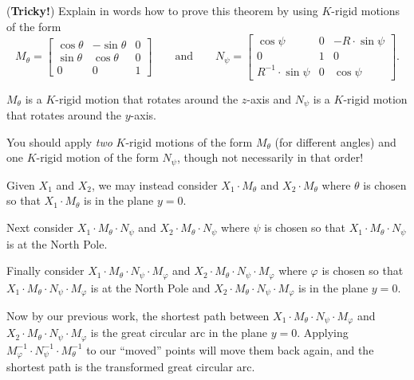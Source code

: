 \documentclass[newpage,hints,handout]{ximera}
\begin{document}
\begin{problem} (\textbf{Tricky!})
  Explain in words how to prove this theorem by using $K$-rigid
  motions of the form
  \[
  M_\theta=
  \begin{bmatrix}
    \cos\theta & -\sin\theta & 0\\
    \sin\theta & \cos\theta & 0\\
    0 & 0 & 1
  \end{bmatrix}
  \qquad\text{and}\qquad
  N_\psi=
  \begin{bmatrix}
    \cos\psi & 0 & -R\cdot\sin\psi\\
    0 & 1 & 0\\
    R^{-1}\cdot\sin\psi & 0 & \cos\psi
  \end{bmatrix}.
  \]
  \begin{hint}
    $M_\theta$ is a $K$-rigid motion that rotates around the $z$-axis and
    $N_\psi$ is a $K$-rigid motion that rotates around the $y$-axis.
  \end{hint}
  \begin{hint}
    You should apply \textit{two} $K$-rigid motions of the form
    $M_\theta$ (for different angles) and one $K$-rigid motion of the
    form $N_\psi$, though not necessarily in that order!
  \end{hint}
  \begin{freeResponse}
    Given $X_1$ and $X_2$, we may instead consider $X_1\cdot M_\theta$
    and $X_2\cdot M_\theta$ where $\theta$ is chosen so that $X_1\cdot
    M_\theta$ is in the plane $y=0$.

    Next consider $X_1\cdot M_\theta\cdot N_\psi$ and $X_2\cdot
    M_\theta\cdot N_\psi$ where $\psi$ is chosen so that $X_1\cdot
    M_\theta\cdot N_\psi$ is at the North Pole.

    Finally consider $X_1\cdot M_\theta\cdot N_\psi\cdot M_\varphi$
    and $X_2\cdot M_\theta\cdot N_\psi\cdot M_\varphi$ where $\varphi$
    is chosen so that $X_1\cdot M_\theta\cdot N_\psi\cdot M_\varphi$
    is at the North Pole and $X_2\cdot M_\theta\cdot N_\psi\cdot
    M_\varphi$ is in the plane $y=0$.

    Now by our previous work, the shortest path between $X_1\cdot
    M_\theta\cdot N_\psi\cdot M_\varphi$ and $X_2\cdot M_\theta\cdot
    N_\psi\cdot M_\varphi$ is the great circular arc in the plane
    $y=0$. Applying $M_\varphi^{-1}\cdot N_\psi^{-1}\cdot
    M_\theta^{-1}$ to our ``moved'' points will move them back again,
    and the shortest path is the transformed great circular arc.
  \end{freeResponse}
\end{problem}
\end{document}
